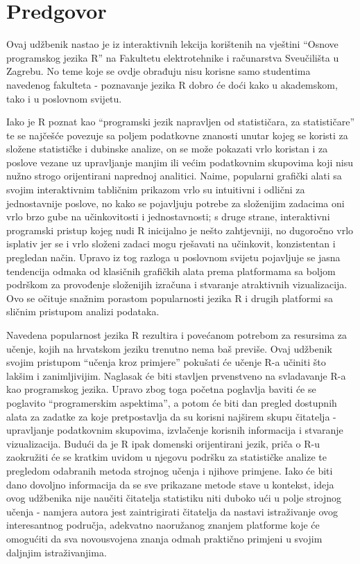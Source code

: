 \documentclass[]{book}
\theoremstyle{definition}
\theoremstyle{definition}
\theoremstyle{definition}
\theoremstyle{remark}
\begin{document}
\section*{Predgovor}\label{predgovor}

Ovaj udžbenik nastao je iz interaktivnih lekcija korištenih na vještini
``Osnove programskog jezika R'' na Fakultetu elektrotehnike i
računarstva Sveučilišta u Zagrebu. No teme koje se ovdje obrađuju nisu
korisne samo studentima navedenog fakulteta - poznavanje jezika R dobro
će doći kako u akademskom, tako i u poslovnom svijetu.

Iako je R poznat kao ``programski jezik napravljen od statističara, za
statističare'' te se najčešće povezuje sa poljem podatkovne znanosti
unutar kojeg se koristi za složene statističke i dubinske analize, on se
može pokazati vrlo koristan i za poslove vezane uz upravljanje manjim
ili većim podatkovnim skupovima koji nisu nužno strogo orijentirani
naprednoj analitici. Naime, popularni grafički alati sa svojim
interaktivnim tabličnim prikazom vrlo su intuitivni i odlični za
jednostavnije poslove, no kako se pojavljuju potrebe za složenijim
zadacima oni vrlo brzo gube na učinkovitosti i jednostavnosti; s druge
strane, interaktivni programski pristup kojeg nudi R inicijalno je nešto
zahtjevniji, no dugoročno vrlo isplativ jer se i vrlo složeni zadaci
mogu rješavati na učinkovit, konzistentan i pregledan način. Upravo iz
tog razloga u poslovnom svijetu pojavljuje se jasna tendencija odmaka od
klasičnih grafičkih alata prema platformama sa boljom podrškom za
provođenje složenijih izračuna i stvaranje atraktivnih vizualizacija.
Ovo se očituje snažnim porastom popularnosti jezika R i drugih platformi
sa sličnim pristupom analizi podataka.

Navedena popularnost jezika R rezultira i povećanom potrebom za
resursima za učenje, kojih na hrvatskom jeziku trenutno nema baš
previše. Ovaj udžbenik svojim pristupom ``učenja kroz primjere''
pokušati će učenje R-a učiniti što lakšim i zanimljivijim. Naglasak će
biti stavljen prvenstveno na svladavanje R-a kao programskog jezika.
Upravo zbog toga početna poglavlja baviti će se poglavito
``programerskim aspektima'', a potom će biti dan pregled dostupnih alata
za zadatke za koje pretpostavlja da su korisni najširem skupu čitatelja
- upravljanje podatkovnim skupovima, izvlačenje korisnih informacija i
stvaranje vizualizacija. Budući da je R ipak domenski orijentirani
jezik, priča o R-u zaokružiti će se kratkim uvidom u njegovu podršku za
statističke analize te pregledom odabranih metoda strojnog učenja i
njihove primjene. Iako će biti dano dovoljno informacija da se sve
prikazane metode stave u kontekst, ideja ovog udžbenika nije naučiti
čitatelja statistiku niti duboko ući u polje strojnog učenja - namjera
autora jest zaintrigirati čitatelja da nastavi istraživanje ovog
interesantnog područja, adekvatno naoružanog znanjem platforme koje će
omogućiti da sva novousvojena znanja odmah praktično primjeni u svojim
daljnjim istraživanjima.
\end{document}
